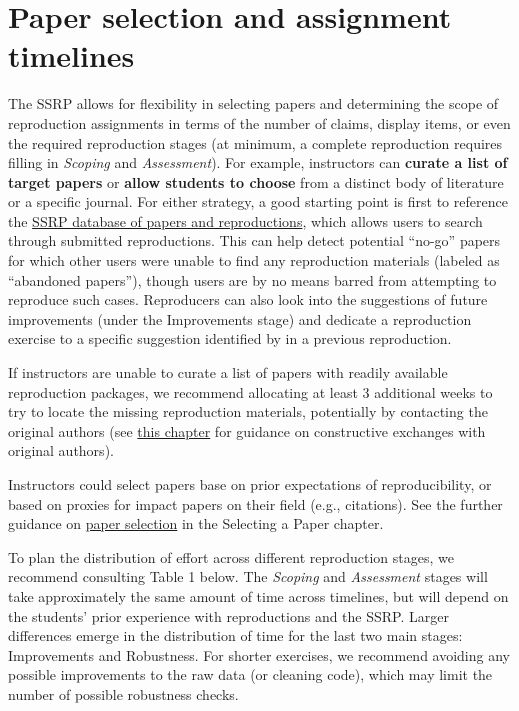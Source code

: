 \documentclass[
  openany]{book}
\begin{document}
\hypertarget{paper-selection-and-assignment-timelines}{%
\section{Paper selection and assignment timelines}\label{paper-selection-and-assignment-timelines}}

The SSRP allows for flexibility in selecting papers and determining the scope of reproduction assignments in terms of the number of claims, display items, or even the required reproduction stages (at minimum, a complete reproduction requires filling in \emph{Scoping} and \emph{Assessment}). For example, instructors can \textbf{curate a list of target papers} or \textbf{allow students to choose} from a distinct body of literature or a specific journal. For either strategy, a good starting point is first to reference the \href{https://www.socialsciencereproduction.org/reproductions/search}{SSRP database of papers and reproductions}, which allows users to search through submitted reproductions. This can help detect potential ``no-go'' papers for which other users were unable to find any reproduction materials (labeled as ``abandoned papers''), though users are by no means barred from attempting to reproduce such cases. Reproducers can also look into the suggestions of future improvements (under the Improvements stage) and dedicate a reproduction exercise to a specific suggestion identified by in a previous reproduction.

If instructors are unable to curate a list of papers with readily available reproduction packages, we recommend allocating at least 3 additional weeks to try to locate the missing reproduction materials, potentially by contacting the original authors (see \href{https://bitss.github.io/ACRE/comunications.html\#comunications}{this chapter} for guidance on constructive exchanges with original authors).

Instructors could select papers base on prior expectations of reproducibility, or based on proxies for impact papers on their field (e.g., citations). See the further guidance on \protect\hyperlink{identify-timeline}{paper selection} in the Selecting a Paper chapter.

To plan the distribution of effort across different reproduction stages, we recommend consulting Table 1 below. The \emph{Scoping} and \emph{Assessment} stages will take approximately the same amount of time across timelines, but will depend on the students' prior experience with reproductions and the SSRP. Larger differences emerge in the distribution of time for the last two main stages: Improvements and Robustness. For shorter exercises, we recommend avoiding any possible improvements to the raw data (or cleaning code), which may limit the number of possible robustness checks.
\end{document}
